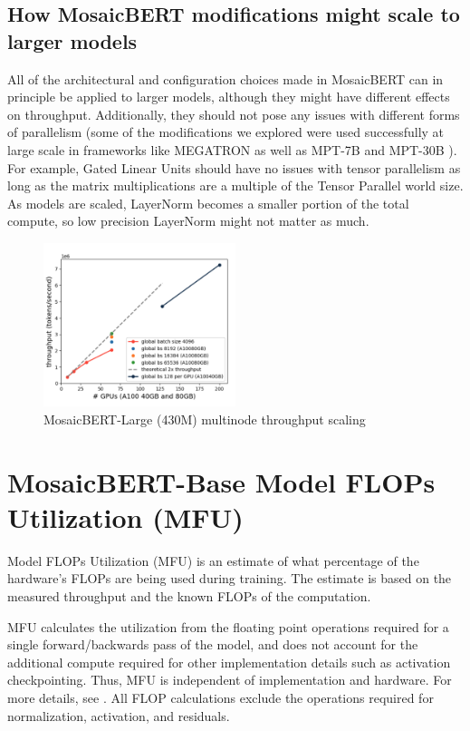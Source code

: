 \subsection{How MosaicBERT modifications might scale to larger models}
All of the architectural and configuration choices made in MosaicBERT can in principle be applied to larger models, although they might have different effects on throughput. Additionally, they should not pose any issues with different forms of parallelism (some of the modifications we explored were used successfully at large scale in frameworks like MEGATRON as well as MPT-7B and MPT-30B \citep{MosaicML2023IntroducingMPT7B,MosaicML2023IntroducingMPT30B}). For example, Gated Linear Units should have no issues with tensor parallelism as long as the matrix multiplications are a multiple of the Tensor Parallel world size. As models are scaled, LayerNorm becomes a smaller portion of the total compute, so low precision LayerNorm might not matter as much.



\begin{figure}[h!]
    \centering
    \includegraphics[width=0.5\textwidth]{figures/rapid-bert-large-throughput.png}
    \caption{MosaicBERT-Large (430M) multinode throughput scaling}
    \label{fig:bert-large-throughput}
\end{figure}






\section{MosaicBERT-Base Model FLOPs Utilization (MFU)}

Model FLOPs Utilization (MFU) is an estimate of what percentage of the hardware's FLOPs are being used during training.  The estimate is based on the measured throughput and the known FLOPs of the computation.

MFU calculates the utilization from the floating point operations required for a single forward/backwards pass of the model, and does not account for the additional compute required for other implementation details such as activation checkpointing. Thus, MFU is independent of implementation and hardware. For more details, see \cite{korthikanti2022reducing}. All FLOP calculations exclude the operations required for normalization, activation, and residuals.


